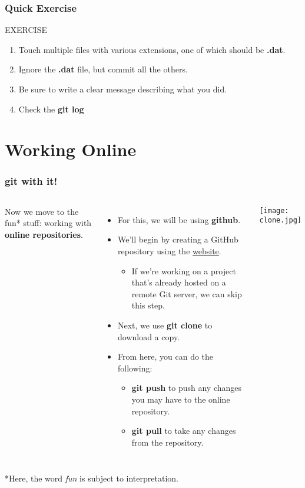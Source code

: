 \documentclass{beamer}
\begin{document}
\begin{frame}[fragile]
\frametitle{Quick Exercise}
    \begin{block}{EXERCISE}
        \begin{enumerate}
        \item Touch multiple files with various extensions, one of which should be \textbf{.dat}.
        \item Ignore the \textbf{.dat} file, but commit all the others.
        \item Be sure to write a clear message describing what you did.
        \item Check the \textbf{git log}
        \end{enumerate}
    \end{block}

\end{frame}

\section{Working Online}

\begin{frame}
\frametitle{\textbf{git} with it!}
\begin{columns}
Now we move to the fun* stuff: working with \textbf{online repositories}.
\begin{itemize}
\item For this, we will be using \textbf{github}.
\item We'll begin by creating a GitHub repository using the \href{www.github.com}{website}.
\begin{itemize}
\item If we're working on a project that's already hosted on a remote Git server, we can skip this step.
\end{itemize}
\item Next, we use \textbf{git clone} to download a copy.
\item From here, you can do the following:
\begin{itemize}
\item \textbf{git push} to push any changes you may have to the online repository.
\item \textbf{git pull} to take any changes from the repository.
\end{itemize}
\end{itemize}
\texttt{[image: clone.jpg]}
\end{columns}

*Here, the word \textit{fun} is subject to interpretation.
\end{frame}
\end{document}
